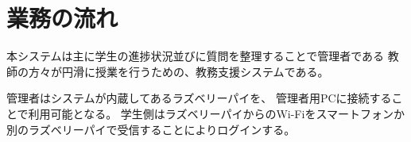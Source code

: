 \section{業務の流れ}
本システムは主に学生の進捗状況並びに質問を整理することで管理者である
教師の方々が円滑に授業を行うための、教務支援システムである。

管理者はシステムが内蔵してあるラズベリーパイを、
管理者用PCに接続することで利用可能となる。
学生側はラズベリーパイからのWi-Fiをスマートフォンか
別のラズベリーパイで受信することによりログインする。

